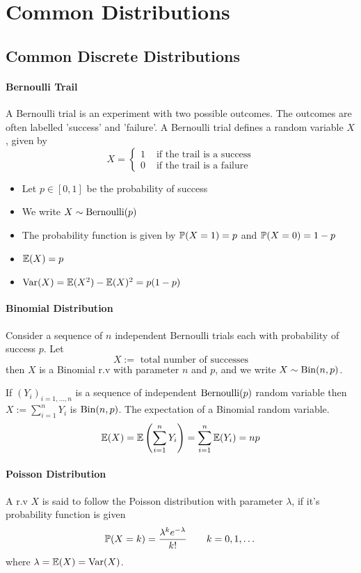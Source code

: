 \section{Common Distributions}

\subsection{Common Discrete Distributions}
\paragraph{Bernoulli Trail}
A Bernoulli trial is an experiment with two possible outcomes. The outcomes are often labelled 'success' and 'failure'. A Bernoulli trial defines a random variable \(X\), given by 
\[ X = \begin{cases}
    1 & \text{ if the trail is a success} \\
    0 & \text{ if the trail is a failure}
\end{cases}\]
\begin{itemize}
    \item Let \(p \in [0,1]\) be the probability of success
    \item We write \(X \sim \mathrm{Bernoulli}(p)\)
    \item The probability function is given by \(\mathbb{P}(X = 1) = p\) and \(\mathbb{P}(X = 0) = 1 - p\)
    \item \(\mathbb{E}(X) = p\)
    \item \(\mathrm{Var}(X) = \mathbb{E}(X^2) - \mathbb{E}(X)^2 = p(1-p)\)
\end{itemize}

\paragraph{Binomial Distribution}
Consider a sequence of \(n\) independent Bernoulli trials each with probability of success \(p\). Let
\[X := \text{ total number of successes}\]
then \(X\) is a Binomial r.v with parameter \(n\) and \(p\), and we write \(X \sim \mathrm{Bin}(n,p)\).

If \((Y_i)_{i=1,\dots,n}\) is a sequence of independent \(\mathrm{Bernoulli}(p)\) random variable then \(X := \sum_{i=1}^n Y_i\) is \(\mathrm{Bin}(n,p)\). The expectation of a Binomial random variable.
\[\mathbb{E}(X) = \mathbb{E}\left(\sum_{i=1}^n Y_i\right) = \sum_{i=1}^n \mathbb{E}(Y_i) = np\]

\paragraph{Poisson Distribution}
A r.v \(X\) is said to follow the Poisson distribution with parameter \(\lambda\), if it's probability function is given
\[\mathbb{P}(X = k) = \frac{\lambda^k e^{-\lambda}}{k!} \qquad k = 0,1,\dots\]
where \(\lambda = \mathbb{E}(X) = \mathrm{Var}(X)\).

